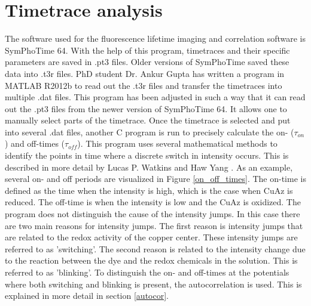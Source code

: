 \documentclass[twoside,single]{lion-msc}
\begin{document}
\section*{Timetrace analysis}\label{dats_colls}
The software used for the fluorescence lifetime imaging and correlation software is SymPhoTime 64. With the help of this program, timetraces and their specific parameters are saved in .pt3 files. Older versions of SymPhoTime saved these data into .t3r files. PhD student Dr. Ankur Gupta has written a program in MATLAB R2012b to read out the .t3r files and transfer the timetraces into multiple .dat files. This program has been adjusted in such a way that it can read out the .pt3 files from the newer version of SymPhoTime 64. It allows one to manually select parts of the timetrace. Once the timetrace is selected and put into several .dat files, another C program is run to precisely calculate the  on- ($\tau_{on}$) and off-times ($\tau_{off}$). This program uses several mathematical methods to identify the points in time where a discrete switch in intensity occurs. This is described in more detail by Lucas P. Watkins and Haw Yang \cite{And2004}. As an example, several on- and off periods are visualized in Figure \ref{on_off_times}. The on-time is defined as the time when the intensity is high, which is the case when CuAz is reduced. The off-time is when the intensity is low and the CuAz is oxidized. The program does not distinguish the cause of the intensity jumps. In this case there are two main reasons for intensity jumps. The first reason is intensity jumps that are related to the redox activity of the copper center. These intensity jumps are referred to as 'switching'. The second reason is related to the intensity change due to the reaction between the dye and the redox chemicals in the solution. This is referred to as 'blinking'. To distinguish the on- and off-times at the potentials where both switching and blinking is present, the autocorrelation is used. This is explained in more detail in section \ref{autocor}.
\end{document}
